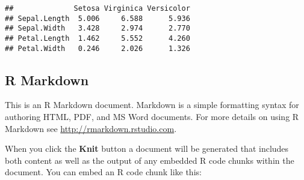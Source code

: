 \documentclass[
]{article}
\newenvironment{Shaded}{\begin{snugshade}}{\end{snugshade}}
\newcommand{\AttributeTok}[1]{\textcolor[rgb]{0.13,0.29,0.53}{#1}}
\newcommand{\ControlFlowTok}[1]{\textcolor[rgb]{0.13,0.29,0.53}{\textbf{#1}}}
\newcommand{\DecValTok}[1]{\textcolor[rgb]{0.00,0.00,0.81}{#1}}
\newcommand{\FunctionTok}[1]{\textcolor[rgb]{0.13,0.29,0.53}{\textbf{#1}}}
\newcommand{\NormalTok}[1]{#1}
\newcommand{\OtherTok}[1]{\textcolor[rgb]{0.56,0.35,0.01}{#1}}
\newcommand{\SpecialCharTok}[1]{\textcolor[rgb]{0.81,0.36,0.00}{\textbf{#1}}}
\newcommand{\StringTok}[1]{\textcolor[rgb]{0.31,0.60,0.02}{#1}}
\begin{document}
\begin{Shaded}
\end{Shaded}

\begin{verbatim}
##              Setosa Virginica Versicolor
## Sepal.Length  5.006     6.588      5.936
## Sepal.Width   3.428     2.974      2.770
## Petal.Length  1.462     5.552      4.260
## Petal.Width   0.246     2.026      1.326
\end{verbatim}

\hypertarget{r-markdown}{%
\subsection{R Markdown}\label{r-markdown}}

This is an R Markdown document. Markdown is a simple formatting syntax
for authoring HTML, PDF, and MS Word documents. For more details on
using R Markdown see \url{http://rmarkdown.rstudio.com}.

When you click the \textbf{Knit} button a document will be generated
that includes both content as well as the output of any embedded R code
chunks within the document. You can embed an R code chunk like this:
\end{document}
